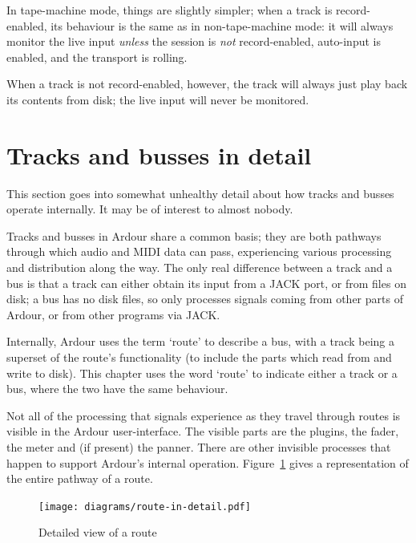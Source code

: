 \documentclass[10pt,a4paper]{book}
\begin{document}
In tape-machine mode, things are slightly simpler; when a track is
record-enabled, its behaviour is the same as in non-tape-machine mode:
it will always monitor the live input \emph{unless} the session is
\emph{not} record-enabled, auto-input is enabled, and the transport is
rolling.

When a track is not record-enabled, however, the track will always
just play back its contents from disk; the live input will never be
monitored.




\section{Tracks and busses in detail}

\begin{ddanger}
This section goes into somewhat unhealthy detail about how tracks and
busses operate internally.  It may be of interest to almost nobody.
\end{ddanger}

Tracks and busses in Ardour share a common basis; they are both
pathways through which audio and MIDI data can pass, experiencing
various processing and distribution along the way.  The only real
difference between a track and a bus is that a track can either obtain
its input from a JACK port, or from files on disk; a bus has no disk
files, so only processes signals coming from other parts of Ardour, or
from other programs via JACK\@.

Internally, Ardour uses the term `route' to describe a bus, with a
track being a superset of the route's functionality (to include the
parts which read from and write to disk).  This chapter uses the word
`route' to indicate either a track or a bus, where the two have the
same behaviour.

Not all of the processing that signals experience as they travel
through routes is visible in the Ardour user-interface. The visible parts
are the plugins, the fader, the meter and (if present) the panner.
There are other invisible processes that happen to support Ardour's
internal operation.  Figure~\ref{fig:route-in-detail} gives a
representation of the entire pathway of a route.

\begin{figure}[ht]
\begin{center}
\texttt{[image: diagrams/route-in-detail.pdf]}
\end{center}
\caption{Detailed view of a route}
\label{fig:route-in-detail}
\end{figure}
\end{document}
